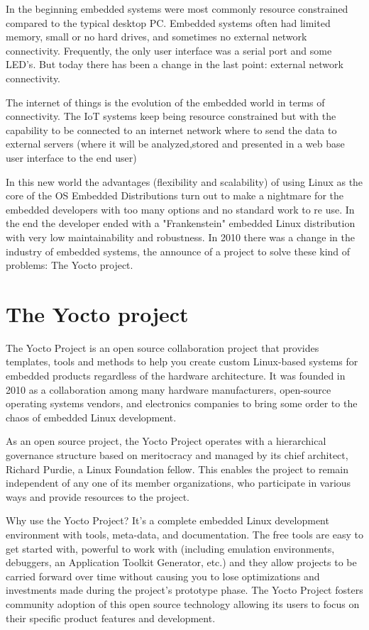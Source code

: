 In the beginning embedded systems were most commonly resource constrained
compared to the typical desktop PC. Embedded systems often had limited memory,
small or no hard drives, and sometimes no external network connectivity.
Frequently, the only user interface was a serial port and some LED's. But today
there has been a change in the last point: external network connectivity.

The internet of things is the evolution of the embedded world in terms of
connectivity. The IoT systems keep being resource constrained but with the
capability to be connected to an internet network where to send the data to
external servers (where it will be analyzed,stored and presented in a web base
user interface to the end user)

In this new world the advantages (flexibility and scalability) of using Linux
as the core of the OS Embedded Distributions turn out to make a nightmare for
the embedded developers with too many options and no standard work to re use.
In the end the developer ended with a "Frankenstein" embedded Linux
distribution with very low maintainability and robustness. In 2010 there was a
change in the industry of embedded systems, the announce of a project to solve
these kind of problems: The Yocto project.

\section{The Yocto project}
\noindent
The Yocto Project is an open source collaboration project that provides
templates, tools and methods to help you create custom Linux-based systems for
embedded products regardless of the hardware architecture. It was founded in
2010 as a collaboration among many hardware manufacturers, open-source
operating systems vendors, and electronics companies to bring some order to the
chaos of embedded Linux development.

As an open source project, the Yocto Project operates with a hierarchical
governance structure based on meritocracy and managed by its chief architect,
Richard Purdie, a Linux Foundation fellow. This enables the project to remain
independent of any one of its member organizations, who participate in various
ways and provide resources to the project.

Why use the Yocto Project? It's a complete embedded Linux development
environment with tools, meta-data, and documentation. The
free tools are easy to get started with, powerful to work with (including
emulation environments, debuggers, an Application Toolkit Generator, etc.) and
they allow projects to be carried forward over time without causing you to lose
optimizations and investments made during the project’s prototype phase. The
Yocto Project fosters community adoption of this open source technology
allowing its users to focus on their specific product features and development.

